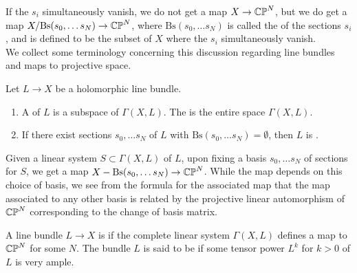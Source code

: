 %
If the $s_i$ simultaneously vanish, we do not get a map
$X \to \mathbb{CP}^N$, but we do get a map $X / \mathrm{Bs}(s_0,\ldots s_N) \to \mathbb{CP}^N$, where
$\mathrm{Bs}(s_0,\ldots s_N)$ is called the  of the sections
$s_i$, and is defined to be the subset of $X$ where the $s_i$ simultaneously vanish. \\

We collect some terminology concerning this discussion regarding line bundles
and maps to projective space.
%
\begin{defn}
Let $L \to X$ be a holomorphic line bundle.
\begin{enumerate}
  \item A  of $L$ is a subspace of $\Gamma(X,L)$.
  The  is the entire space $\Gamma(X,L)$.
  \item If there exist sections $s_0,\ldots s_N$ of $L$ with
  $\mathrm{Bs}(s_0,\ldots s_N) = \emptyset$, then $L$ is .
\end{enumerate}
\end{defn}
%
Given a linear system $S \subset \Gamma(X,L)$ of $L$, upon fixing a basis
$s_0,\ldots s_N$ of sections for $S$, we get a map
$X-\mathrm{Bs}(s_0,\ldots s_N) \to \mathbb{CP}^N$. While the map depends on this
choice of basis, we see from the formula for the associated map that the
map associated to any other basis is related by the projective linear automorphism
of $\mathbb{CP}^N$ corresponding to the change of basis matrix.
%
\begin{defn}
A line bundle $L \to X$ is  if the complete linear system
$\Gamma(X,L)$ defines a map to $\mathbb{CP}^N$ for some $N$. The bundle $L$ is said to be
 if some tensor power $L^k$ for $k > 0$ of $L$ is very ample.
\end{defn}
%